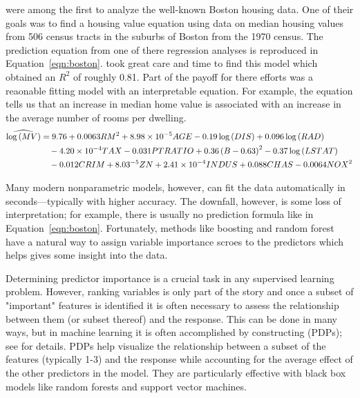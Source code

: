 \citet{harrison-1978-hedonic} were among the first to analyze the well-known Boston housing data. One of their goals was to find a housing value equation using data on median housing values from 506 census tracts in the suburbs of Boston from the 1970 census. The prediction equation from one of there regression analyses is reproduced in Equation~\eqref{eqn:boston}. \citet{harrison-1978-hedonic} took great care and time to find this model which obtained an $R^2$ of roughly 0.81. Part of the payoff for there efforts was a reaonable fitting model with an interpretable equation. For example, the equation tells us that an increase in median home value is associated with an increase in the average number of rooms per dwelling.
\begin{equation}
\label{eqn:boston}
\begin{split}
\widehat{\log\left(MV\right)} &= 9.76 + 0.0063 RM^2 + 8.98\times10^{-5} AGE - 0.19\log\left(DIS\right) + 0.096\log\left(RAD\right) \\
  &\quad - 4.20\times10^{-4} TAX - 0.031 PTRATIO + 0.36\left(B - 0.63\right)^2 - 0.37\log\left(LSTAT\right) \\
  &\quad - 0.012 CRIM + 8.03\time10^{-5} ZN + 2.41\times10^{-4} INDUS + 0.088 CHAS - 0.0064 NOX^2
\end{split}
\end{equation}

Many modern nonparametric models, however, can fit the data automatically in seconds---typically with higher accuracy. The downfall, however, is some loss of interpretation; for example, there is usually no prediction formula like in Equation~\eqref{eqn:boston}. Fortunately, methods like boosting and random forest have a natural way to assign variable importance scroes to the predictors which helps gives some insight into the data.

Determining predictor importance is a crucial task in any supervised learning problem. However, ranking variables is only part of the story and once a subset of "important" features is identified it is often necessary to assess the relationship between them (or subset thereof) and the response. This can be done in many ways, but in machine learning it is often accomplished by constructing  (PDPs); see \citet{friedman-2000-greedy} for details. PDPs help visualize the relationship between a subset of the features (typically 1-3) and the response while accounting for the average effect of the other predictors in the model. They are particularly effective with black box models like random forests and support vector machines.

